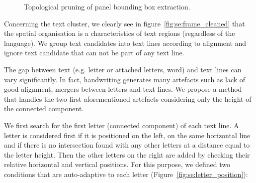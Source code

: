 	\begin{figure}	%
	  \centering
			\hspace{2em}
		  \caption[Topological pruning of panel bounding box extraction]{Topological pruning of panel bounding box extraction.}
	\end{figure}

Concerning the text cluster, we clearly see in figure~\ref{fig:se:frame_cleaned} that the spatial organisation is a characteristics of text regions (regardless of the language).
We group text candidates into text lines according to alignment and ignore text candidate that can not be part of any text line.

The gap between text (e.g. letter or attached letters, word) and text lines can vary significantly.
In fact, handwriting generates many artefacts such as lack of good alignment, mergers between letters and text lines.
We propose a method that handles the two first aforementioned artefacts considering only the height of the connected component.

We first search for the first letter (connected component) of each text line.
A letter is considered first if it is positioned on the left, on the same horizontal line and if there is no intersection found with any other letters at a distance equal to the letter height.
Then the other letters on the right are added by checking their relative horizontal and vertical positions.
For this purpose, we defined two conditions that are auto-adaptive to each letter (Figure~\ref{fig:se:letter_position}):

